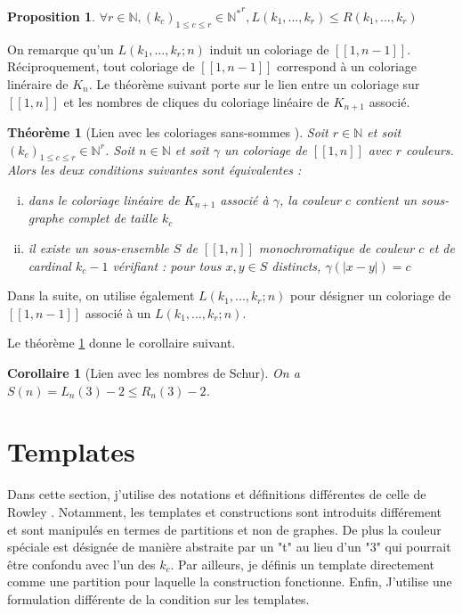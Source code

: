 \documentclass{article}
\newtheorem{theorem}[definition]{Théorème}
\newtheorem{corollary}[definition]{Corollaire}
\newtheorem{proposition}[definition]{Proposition}
\begin{document}
\begin{proposition}
\(\forall r \in \mathbb{N}, (k_c)_{1 \leqslant c \leqslant r} \in {\mathbb{N}^*}^r, L(k_1, ..., k_r) \leqslant R(k_1, ..., k_r)\)
\end{proposition}

On remarque qu'un \(L(k_1, ..., k_r ; n)\) induit un coloriage de \([\![1, n - 1]\!]\). Réciproquement, tout coloriage de \([\![1, n - 1]\!]\) correspond à un coloriage linéraire de \(K_n\). Le théorème suivant porte sur le lien entre un coloriage sur \([\![1, n]\!]\) et les nombres de cliques du coloriage linéaire de \(K_{n+1}\) associé.

\begin{theorem}[Lien avec les coloriages sans-sommes \cite{AbbottHanson}]
\label{thm:lien-partitions}
Soit \(r \in \mathbb{N}\) et soit \((k_c)_{1 \leqslant c \leqslant r} \in \mathbb{N}^r\). Soit \(n \in \mathbb{N}\) et soit \(\gamma\) un coloriage de \([\![1, n]\!]\) avec \(r\) couleurs. Alors les deux conditions suivantes sont équivalentes :
\begin{enumerate}[(i)]
\item dans le coloriage linéaire de \(K_{n+1}\) associé à \(\gamma\), la couleur \(c\) contient un sous-graphe complet de taille \(k_c\)
\item il existe un sous-ensemble \(S\) de \([\![1, n]\!]\) monochromatique de couleur \(c\) et de cardinal \(k_c - 1\) vérifiant : pour tous \(x, y \in S\) distincts, \(\gamma(|x - y|) = c\) 
\end{enumerate}
\end{theorem}

Dans la suite, on utilise également \(L(k_1, ..., k_r ; n)\) pour désigner un coloriage de \([\![1, n - 1]\!]\)  associé à un \(L(k_1, ..., k_r ; n)\).

Le théorème \ref{thm:lien-partitions} donne le corollaire suivant.

\begin{corollary}[Lien avec les nombres de Schur]
On a \(S(n) = L_n(3) - 2 \leqslant R_n(3) - 2\). 
\end{corollary}

\section{Templates}
\label{sec:temp}

Dans cette section, j'utilise des notations et définitions différentes de celle de Rowley \cite{RowleyRamsey}. Notamment, les templates et constructions sont introduits différement et sont manipulés en termes de partitions et non de graphes. De plus la couleur spéciale est désignée de manière abstraite par un "t" au lieu d'un "3" qui pourrait être confondu avec l'un des \(k_c\). Par ailleurs, je définis un template directement comme une partition pour laquelle la construction fonctionne. Enfin, J'utilise une formulation différente de la condition sur les templates.
\end{document}

